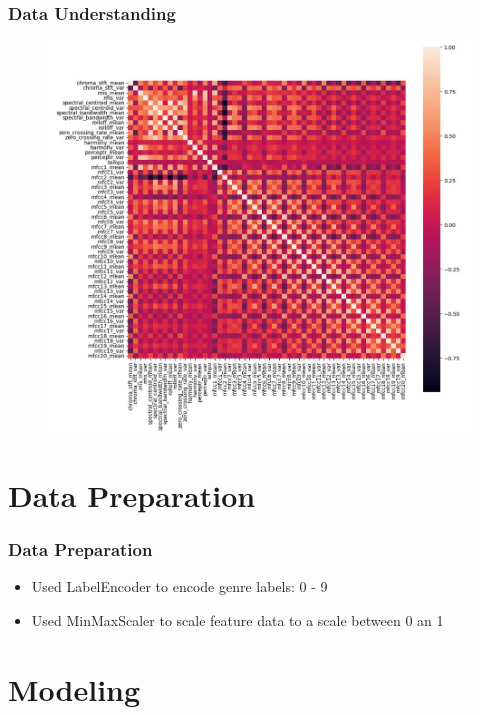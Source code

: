 \documentclass[10pt, aspectratio=169]{beamer}
\begin{document}
\begin{frame}
    \frametitle{Data Understanding}
    \begin{figure}
        \centering
        \includegraphics[width=0.65\linewidth]{img/Heatmap.jpg}
    \end{figure}
\end{frame}

\section{Data Preparation}
\begin{frame}
    \frametitle{Data Preparation}
    \begin{itemize}\setlength\itemsep{12pt}
        \item Used LabelEncoder to encode genre labels: 0 - 9
        \item Used MinMaxScaler to scale feature data to a scale between 0 an 1
    \end{itemize}
\end{frame}

\section{Modeling}
\end{document}
